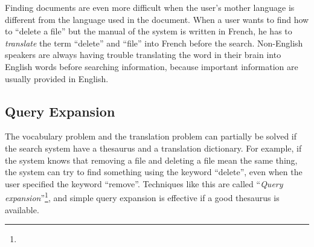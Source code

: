 \documentclass[manuscript,anonymous,review]{acmart}
\begin{document}

Finding documents are even more difficult when
the user's mother language is different from the language used in the document.
When a user wants to find how to ``delete a file'' but the
manual of the system is written in French,
he has to \textit{translate} the term ``delete'' and ``file'' into French
before the search.
Non-English speakers are always having trouble
translating the word in their brain into English words
before searching information, because important information are
usually provided in English.


\subsection*{Query Expansion}

% 
%

The vocabulary problem and the translation problem can partially be solved
if the search system have a thesaurus and a translation dictionary.
%
For example, 
if the system knows that removing a file and deleting a file mean the same thing,
the system can try to find something using the keyword ``delete'',
even when the user specified the keyword ``remove''.
%
Techniques like this are called ``\textit{Query expansion}''\footnote{
},
and simple query expansion is effective if a good thesaurus is available.
\end{document}
